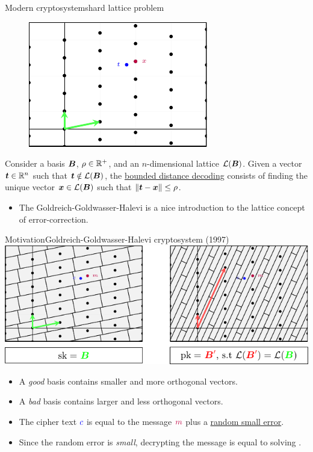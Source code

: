 \documentclass[10pt]{beamer}
\begin{document}
\begin{frame}{Modern cryptosystems}{hard lattice problem}
				\begin{figure}
						\centering
						\includegraphics{figures/cvp.pdf}
				\end{figure}

				\begin{definition} \scriptsize Consider a basis $\boldsymbol{B}$, $\rho \in \mathbb{R}^{+}$, and an $n$-dimensional lattice $\mathcal{L}(\boldsymbol{B})$. Given a vector $\boldsymbol{t} \in \mathbb{R}^{n}$ such that $\boldsymbol{t} \notin \mathcal{L}(\boldsymbol{B})$, the \underline{bounded distance decoding} consists of finding the unique vector $\boldsymbol{x} \in \mathcal{L}(\boldsymbol{B})$ such that $\| \boldsymbol{t} - \boldsymbol{x} \| \leq \rho$.
				\end{definition}

				\begin{itemize}
						\item The Goldreich-Goldwasser-Halevi is a nice introduction to the lattice concept of error-correction.
				\end{itemize}
\end{frame}

\begin{frame}{Motivation}{Goldreich-Goldwasser-Halevi cryptosystem (1997)}
				\includegraphics{figures/ggh-3.pdf}

				\begin{itemize}
								\justifying
								\item A {\color{green}\emph{good}} basis contains smaller and more orthogonal vectors.
								\item A {\color{red}\emph{bad}} basis contains larger and less orthogonal vectors.
								\item The cipher text $\color{blue}c$ is equal to the message ${\color{purple}m}$ plus a \underline{random small error}.
								\item Since the random error is \emph{small}, decrypting the message is equal to solving \BDD.
				\end{itemize}
\end{frame}
\end{document}
